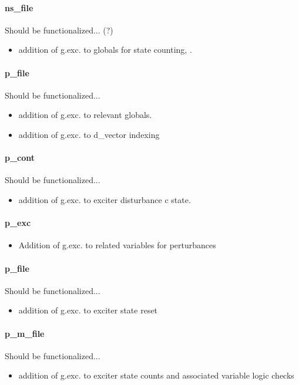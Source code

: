 \documentclass[12pt]{article}
\begin{document}
\paragraph{ns\_file}
Should be functionalized... (?)
	\begin{itemize}
		\item addition of g.exc. to globals for state counting, .
	\end{itemize}

\paragraph{p\_file}
Should be functionalized...
	\begin{itemize}
		\item addition of g.exc. to relevant globals.
		\item addition of g.exc. to d\_vector indexing
	\end{itemize}

\paragraph{p\_cont}
Should be functionalized...
	\begin{itemize}
		\item addition of g.exc. to exciter disturbance c state.
	\end{itemize}

\paragraph{p\_exc}
	\begin{itemize}
		\item Addition of g.exc. to related variables for perturbances
	\end{itemize}

\paragraph{p\_file}
Should be functionalized...
	\begin{itemize}
		\item addition of g.exc. to exciter state reset
	\end{itemize}

\paragraph{p\_m\_file}
Should be functionalized...
	\begin{itemize}
		\item addition of g.exc. to exciter state counts and associated variable logic checks
	\end{itemize}
\end{document}
